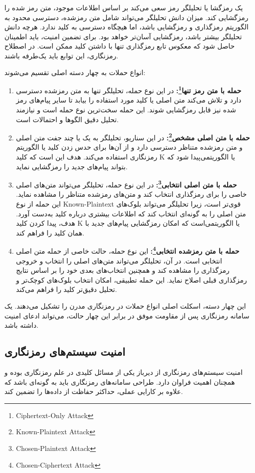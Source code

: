 \documentclass[a4paper,12pt]{report}
\renewcommand{\%}{\lr{\oldpercent}}
\providecommand{\lr}[1]{#1}
\providecommand{\LTRfootnote}[1]{\footnote{#1}}
\begin{document}
یک رمزگشا یا تحلیلگر رمز سعی می‌کند بر اساس اطلاعات موجود، متن رمز شده را رمزگشایی کند. میزان دانش تحلیلگر می‌تواند شامل متن رمزشده، دسترسی محدود به الگوریتم رمزگذاری و رمزگشایی باشد، اما هیچگاه دسترسی به کلید ندارد. هرچه دانش تحلیلگر بیشتر باشد، رمزگشایی آسان‌تر خواهد بود. برای تضمین امنیت، باید اطمینان حاصل شود که معکوس تابع رمزگذاری تنها با داشتن کلید ممکن است. در اصطلاح رمزنگاری، این توابع باید یک‌طرفه باشند.

انواع حملات به چهار دسته اصلی تقسیم می‌شوند:

\begin{enumerate}
    \item \textbf{حمله با متن رمز تنها\LTRfootnote{Ciphertext-Only Attack}:} در این نوع حمله، تحلیلگر تنها به متن رمزشده دسترسی دارد و تلاش می‌کند متن اصلی یا کلید مورد استفاده را بیابد تا سایر پیام‌های رمز شده نیز قابل رمزگشایی شوند. این حمله سخت‌ترین نوع حمله است و نیازمند تحلیل دقیق الگوها و احتمالات است\cite{ref35}.
    \item \textbf{حمله با متن اصلی مشخص\LTRfootnote{Known-Plaintext Attack}:} در این سناریو، تحلیلگر به یک یا چند جفت متن اصلی و متن رمزشده متناظر دسترسی دارد و از آن‌ها برای حدس زدن کلید یا الگوریتم رمزنگاری استفاده می‌کند. هدف این است که کلید \lr{K} یا الگوریتمی‌پیدا شود که بتواند پیام‌های جدید را رمزگشایی نماید.
    \item \textbf{حمله با متن اصلی انتخابی\LTRfootnote{Chosen-Plaintext Attack}:} در این نوع حمله، تحلیلگر می‌تواند متن‌های اصلی خاصی را برای رمزگذاری انتخاب کند و متن‌های رمزشده متناظر را مشاهده نماید. این حمله از نوع \lr{Known-Plaintext} قوی‌تر است، زیرا تحلیلگر می‌تواند بلوک‌های متن اصلی را به گونه‌ای انتخاب کند که اطلاعات بیشتری درباره کلید به‌دست آورد. هدف، پیدا کردن کلید \lr{K} یا الگوریتمی‌است که امکان رمزگشایی پیام‌های جدید با همان کلید را فراهم کند.
    \item \textbf{حمله با متن رمزشده انتخابی\LTRfootnote{Chosen-Ciphertext Attack}:} این نوع حمله، حالت خاصی از حمله متن اصلی انتخابی است. در آن، تحلیلگر می‌تواند متن‌های اصلی را انتخاب و خروجی رمزگذاری را مشاهده کند و همچنین انتخاب‌های بعدی خود را بر اساس نتایج رمزگذاری قبلی اصلاح نماید. این حمله تطبیقی، امکان انتخاب بلوک‌های کوچک‌تر و تحلیل دقیق‌تر کلید را فراهم می‌کند.
\end{enumerate}

این چهار دسته، اسکلت اصلی انواع حملات در رمزنگاری مدرن را تشکیل می‌دهند. یک سامانه رمزنگاری پس از مقاومت موفق در برابر این چهار حالت، می‌تواند ادعای امنیت داشته باشد\cite{ref36}.

\subsection{امنیت سیستم‌های رمزنگاری}
امنیت سیستم‌های رمزنگاری از دیرباز یکی از مسائل کلیدی در علم رمزنگاری بوده و همچنان اهمیت فراوان دارد. طراحی سامانه‌های رمزنگاری باید به گونه‌ای باشد که علاوه بر کارایی عملی، حداکثر حفاظت از داده‌ها را تضمین کند.
\end{document}
